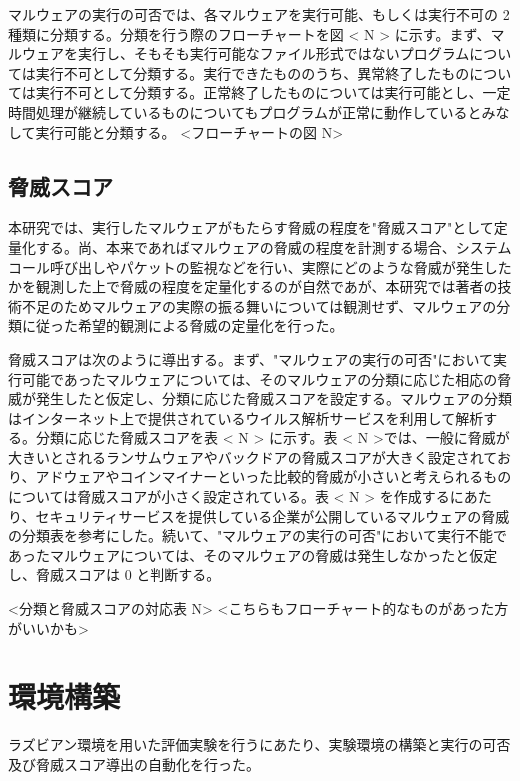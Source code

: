 \documentclass[12pt,a4paper,titlepage,report]{jsbook}
\begin{document}
マルウェアの実行の可否では、各マルウェアを実行可能、もしくは実行不可の 2 種類に分類する。分類を行う際のフローチャートを図 < N > に示す。まず、マルウェアを実行し、そもそも実行可能なファイル形式ではないプログラムについては実行不可として分類する。実行できたもののうち、異常終了したものについては実行不可として分類する。正常終了したものについては実行可能とし、一定時間処理が継続しているものについてもプログラムが正常に動作しているとみなして実行可能と分類する。
<フローチャートの図 N>

\subsection{脅威スコア}
本研究では、実行したマルウェアがもたらす脅威の程度を"脅威スコア"として定量化する。尚、本来であればマルウェアの脅威の程度を計測する場合、システムコール呼び出しやパケットの監視などを行い、実際にどのような脅威が発生したかを観測した上で脅威の程度を定量化するのが自然であが、本研究では著者の技術不足のためマルウェアの実際の振る舞いについては観測せず、マルウェアの分類に従った希望的観測による脅威の定量化を行った。

脅威スコアは次のように導出する。まず、"マルウェアの実行の可否"において実行可能であったマルウェアについては、そのマルウェアの分類に応じた相応の脅威が発生したと仮定し、分類に応じた脅威スコアを設定する。マルウェアの分類はインターネット上で提供されているウイルス解析サービスを利用して解析する。分類に応じた脅威スコアを表 < N > に示す。表 < N >では、一般に脅威が大きいとされるランサムウェアやバックドアの脅威スコアが大きく設定されており、アドウェアやコインマイナーといった比較的脅威が小さいと考えられるものについては脅威スコアが小さく設定されている。表 < N > を作成するにあたり、セキュリティサービスを提供している企業が公開しているマルウェアの脅威の分類表を参考にした\*。続いて、"マルウェアの実行の可否"において実行不能であったマルウェアについては、そのマルウェアの脅威は発生しなかったと仮定し、脅威スコアは 0 と判断する。

<分類と脅威スコアの対応表 N>
<こちらもフローチャート的なものがあった方がいいかも>

\section{環境構築}
\label{環境構築}
ラズビアン環境を用いた評価実験を行うにあたり、実験環境の構築と実行の可否及び脅威スコア導出の自動化を行った。
\end{document}
